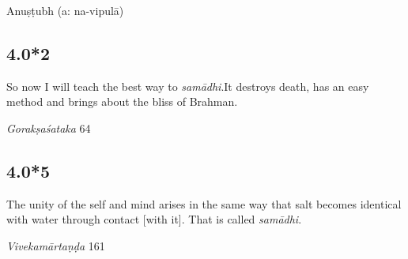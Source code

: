 \begin{ekdosis}
\begin{metre}[hp04_000_1]
Anuṣṭubh (a: na-vipulā)
\end{metre}

\subsection*{4.0*2}
\begin{translation}[hp04_000_2]
So now I will teach the best way to \emph{samādhi}.It destroys death, has an easy method and brings about the bliss of Brahman.
\end{translation}

\begin{sources}[hp04_000_2]
\emph{Gorakṣaśataka} 64
\begin{versinnote}
\tl{\var{64c tu sukhopāyair ] T; sukhadopāyaṃ GU}\\!}
\end{versinnote}
\end{sources}



\subsection*{4.0*5}
\begin{translation}[hp04_000_5]
The unity of the self and mind arises in the same way that salt becomes identical with water through contact [with it]. That is called \emph{samādhi}.
\end{translation}

\begin{sources}[hp04_000_5]
\emph{Vivekamārtaṇḍa} 161
\begin{versinnote}
\end{versinnote}
\end{sources}


\end{ekdosis}
